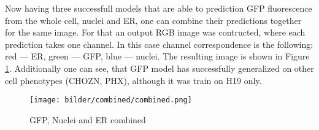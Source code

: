 Now having three successfull models that are able to prediction GFP fluorescence from the whole cell, nuclei and ER, one can combine their predictions together for the same image. For that an output RGB image was contructed, where each prediction takes one channel. In this case channel correspondence is the following: red --- ER, green --- GFP, blue --- nuclei. The resulting image is shown in Figure \ref{fig:combined}. Additionally one can see, that GFP model has successfully generalized on other cell phenotypes (CHOZN, PHX), although it was train on H19 only.
\begin{figure}[htb]
	\begin{center}
		\texttt{[image: bilder/combined/combined.png]}
		\caption{GFP, Nuclei and ER combined}\label{fig:combined}
	\end{center}
\end{figure}
